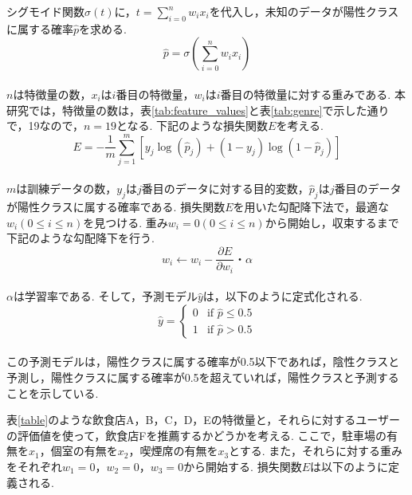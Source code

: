 \documentclass[12pt,a4j]{jreport}
\begin{document}
シグモイド関数\( \sigma(t) \)に，\( t = \sum_{i=0}^{n} w_i x_i \)を代入し，未知のデータが陽性クラスに属する確率\( \hat{p} \)を求める.\\
\[
\hat{p} = \sigma\left(\sum_{i=0}^{n} w_i x_i\right)
\]\\
\( n \)は特徴量の数，\( x_i \)は\( i \)番目の特徴量，\( w_i \)は\( i \)番目の特徴量に対する重みである.
本研究では，特徴量の数は，表\ref{tab:feature_values}と表\ref{tab:genre}で示した通りで，19なので，\( n = 19 \)となる.
下記のような損失関数\( E \)を考える.\\
\[
E = - \frac{1}{m} \sum_{j=1}^{m} \left[ y_j \log(\hat{p}_j) + (1 - y_j) \log(1 - \hat{p}_j) \right]
\]\\
\( m \)は訓練データの数，\( y_j \)は\( j \)番目のデータに対する目的変数，\( \hat{p}_j \)は\( j \)番目のデータが陽性クラスに属する確率である.
損失関数\( E \)を用いた勾配降下法で，最適な\( w_i(0 \leq i \leq n) \)を見つける.
重み\( w_i  = 0 (0 \leq i \leq n) \)から開始し，収束するまで下記のような勾配降下を行う.\\
\[
  w_i ← w_i - \frac{\partial E}{\partial w_i} ・ \alpha
\]\\
\( \alpha \)は学習率である.
そして，予測モデル\( \hat{y} \)は，以下のように定式化される.\\
\[
\hat{y} = 
\begin{cases} 
0 & \text{if } \hat{p} \leq 0.5 \\
1 & \text{if } \hat{p} > 0.5 
\end{cases}
\]\\
この予測モデルは，陽性クラスに属する確率が0.5以下であれば，陰性クラスと予測し，陽性クラスに属する確率が0.5を超えていれば，陽性クラスと予測することを示している.

表\ref{table}のような飲食店A，B，C，D，Eの特徴量と，それらに対するユーザーの評価値を使って，飲食店Fを推薦するかどうかを考える.
ここで，駐車場の有無を\( x_1 \)，個室の有無を\( x_2 \)，喫煙席の有無を\( x_3 \)とする.
また，それらに対する重みをそれぞれ\( w_1 = 0 \)，\( w_2 = 0 \)，\( w_3 = 0 \)から開始する.
損失関数\( E \)は以下のように定義される.\\
\end{document}
